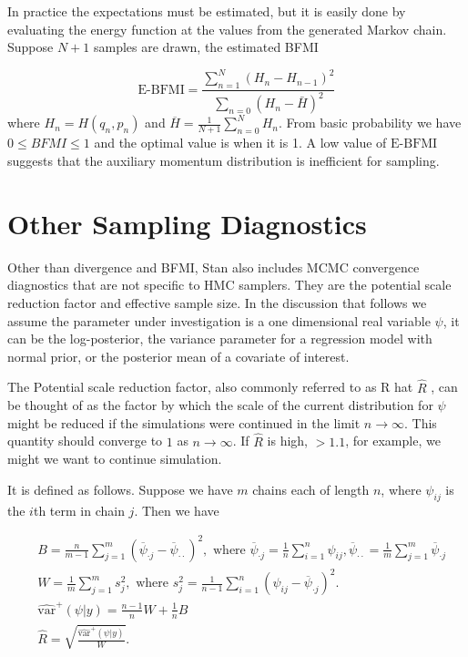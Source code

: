 \documentclass[]{report}
\begin{document}
 In practice the expectations must be estimated, but
it is easily done by evaluating the energy function at the values from the
generated Markov chain. Suppose $N+1$ samples are drawn, the estimated BFMI 

\[ \text{E-BFMI} = \frac{\sum_{n=1}^N(H_n-H_{n-1})^2}{\sum_{n=0}(H_n-\bar{H})^2} \]
where $H_n = H(q_n,p_n)$ and $\overline{H}=\frac{1}{N+1}\sum_{n=0}^N H_n$. From basic
probability we have $0 \le BFMI \le 1 $ and the optimal value is when it is
1. A low value of $\text{E-BFMI}$ suggests that the auxiliary momentum distribution is
inefficient for sampling. 

 
\section{Other Sampling Diagnostics}

Other than divergence and BFMI, Stan also includes MCMC convergence diagnostics that are not specific to HMC samplers. They are the potential scale reduction factor and effective sample size. In the discussion that follows we assume the parameter under investigation is a one dimensional real variable $\psi$, it can be the log-posterior, the variance parameter for a regression model with normal prior, or the posterior mean of a covariate of interest.


The Potential scale reduction factor, also commonly referred to as R hat $\hat{R}$ , can be thought of as the factor by which the scale of the current distribution for $\psi$ might be reduced if the simulations were continued in the limit $n \rightarrow \infty$. This quantity should converge to $1$ as $n \rightarrow \infty$. If $\hat{R}$ is high, $ > 1.1 $, for example, we might we want to continue simulation. 

It is defined as follows. Suppose we have $m$ chains each of length $n$, where $\psi_{ij}$ is the $i$th term in chain $j$. Then we have 

\begin{align*}
&B = \frac{n}{m-1} \sum_{j=1}^{m}(\overline{\psi}_{\cdot j} - \overline{\psi}_{\cdot \cdot})^2, \text{ where } 
\overline{\psi}_{\cdot j} = \frac{1}{n} \sum_{i=1}^n \psi_{ij} , \overline{\psi}_{\cdot \cdot} = \frac{1}{m} \sum_{j=1}^m \overline{\psi}_{\cdot j }
 \\
&W = \frac{1}{m} \sum_{j=1}^m s_j^2 , \text{ where }
s_j^2 = \frac{1}{n-1} \sum_{i=1}^n (\psi_{ij} - \overline{\psi}_{\cdot j } )^2.\\
& \hat{\text{var}}^+(\psi|y) = \frac{n-1}{n} W + \frac{1}{n} B \\
& \hat{R} = \sqrt{\frac{\hat{\text{var}}^+(\psi|y)}{W}}. \\
\end{align*}
\end{document}
